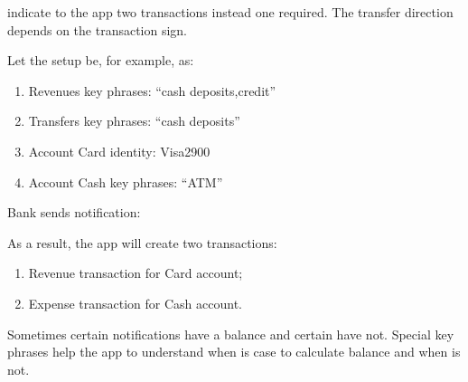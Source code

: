 \documentclass[a4paper,10pt,english]{sphinxmanual}
\begin{document}
 indicate to the app two transactions instead one required.
The transfer direction depends on the transaction sign.

Let the setup be, for example, as:
\begin{enumerate}
\def\theenumi{\arabic{enumi}}
\def\labelenumi{\theenumi .}
\makeatletter\def\p@enumii{\p@enumi \theenumi .}\makeatother
\item {} 
Revenues key phrases: “cash deposits,credit”

\item {} 
Transfers key phrases: “cash deposits”

\item {} 
Account Card identity: Visa2900

\item {} 
Account Cash key phrases: “ATM”

\end{enumerate}

Bank sends notification:

\begin{sphinxVerbatim}[commandchars=\\\{\}]
          
\end{sphinxVerbatim}

As a result, the app will create two transactions:
\begin{enumerate}
\def\theenumi{\arabic{enumi}}
\def\labelenumi{\theenumi .}
\makeatletter\def\p@enumii{\p@enumi \theenumi .}\makeatother
\item {} 
Revenue transaction for Card account;

\item {} 
Expense transaction for Cash account.

\end{enumerate}

\noindent{}

\noindent{}

Sometimes certain notifications have a balance and certain have not. Special
key phrases help the app to understand when is case to calculate balance and when is not.
\end{document}
